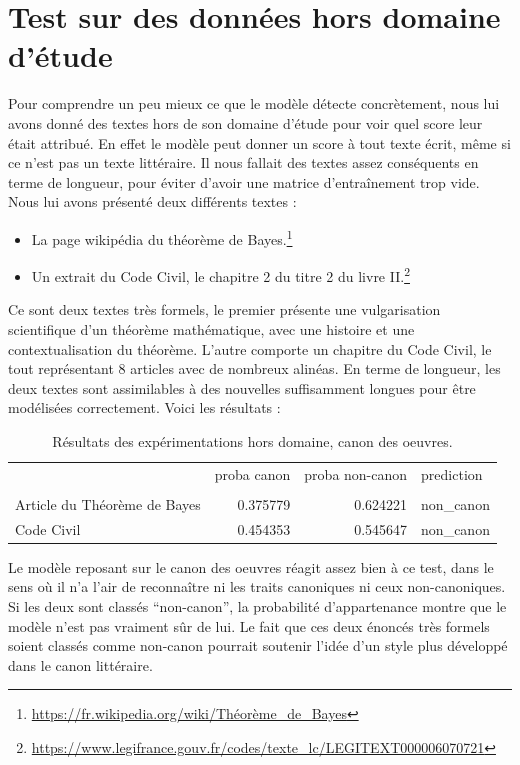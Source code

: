 \section{Test sur des données hors domaine d'étude}

Pour comprendre un peu mieux ce que le modèle détecte concrètement, nous lui avons donné des textes hors de son domaine d'étude pour voir quel score leur était attribué. En effet le modèle peut donner un score à tout texte écrit, même si ce n'est pas un texte littéraire. Il nous fallait des textes assez conséquents en terme de longueur, pour éviter d'avoir une matrice d'entraînement trop vide. Nous lui avons présenté deux différents textes : 

\begin{itemize}
    \item La page wikipédia du théorème de Bayes.\footnote{\url{https://fr.wikipedia.org/wiki/Théorème_de_Bayes}}
    \item Un extrait du Code Civil, le chapitre 2 du titre 2 du livre II.\footnote{\url{https://www.legifrance.gouv.fr/codes/texte_lc/LEGITEXT000006070721}}
\end{itemize}

Ce sont deux textes très formels, le premier présente une vulgarisation scientifique d'un théorème mathématique, avec une histoire et une contextualisation du théorème. L'autre comporte un chapitre du Code Civil, le tout représentant 8 articles avec de nombreux alinéas. En terme de longueur, les deux textes sont assimilables à des nouvelles suffisamment longues pour être modélisées correctement. Voici les résultats :
\bigskip

\begin{table}[ht]
    \centering
    \begin{tabular}{lrrl}
    \toprule
    {} &  proba canon &  proba non-canon & prediction \\
                     &              &                  &            \\
    \midrule
    Article du Théorème de Bayes  &         0.375779 &         0.624221 &  non\_canon \\
    Code Civil                &         0.454353 &         0.545647 &  non\_canon \\
    \bottomrule
    \end{tabular}
    \caption{Résultats des expérimentations hors domaine, canon des oeuvres.}
\end{table}

Le modèle reposant sur le canon des oeuvres réagit assez bien à ce test, dans le sens où il n'a l'air de reconnaître ni les traits canoniques ni ceux non-canoniques. Si les deux sont classés \enquote{non-canon}, la probabilité d'appartenance montre que le modèle n'est pas vraiment sûr de lui. Le fait que ces deux énoncés très formels soient classés comme non-canon pourrait soutenir l'idée d'un style plus développé dans le canon littéraire. 


